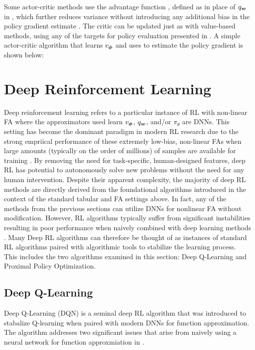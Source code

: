 Some actor-critic methods use the advantage function , defined as %
in place of $q_{\bm w}$ in , which further reduces variance without introducing any additional bias in the policy gradient estimate \cite{sutton1998introduction}.
The critic can be updated just as with value-based methods, using any of the targets for policy evaluation presented in . A simple actor-critic algorithm that learns $v_{\bm \phi}$ and uses  to estimate the policy gradient is shown below:

\section{Deep Reinforcement Learning}
Deep reinforcement learning refers to a particular instance of RL with non-linear FA where the approximators used learn $v_{\bm \phi}$, $q_{\bm w}$, and/or $\pi_\theta$ are DNNs. This setting has become the dominant paradigm in modern RL research due to the strong empriical performance of these extremely low-bias, non-linear FAs when large amounts (typically on the order of millions) of samples are available for training . By removing the need for task-specific, human-designed features, deep RL has potential to autonomously solve new problems without the need for any human intervention. Despite their apparent complexity, the majority of deep RL methods are directly derived from the foundational algorithms introduced in the context of the standard tabular and FA settings above. In fact, any of the methods from the previous sections can utilize DNNs for nonlinear FA without modification. However, RL algorithms typically suffer from significant instabilities resulting in poor performance when naively combined with deep learning methods . Many Deep RL algorithms can therefore be thought of as instances of standard RL algorithms paired with algorithmic tools to stabilize the learning process. This includes the two algorithms examined in this section: Deep Q-Learning and Proximal Policy Optimization.

\subsection{Deep Q-Learning} 
Deep Q-Learning (DQN)  is a seminal deep RL algorithm that was introduced to stabalize Q-learning when paired with modern DNNs for function approximation. The algorithm addresses two significant issues that arise from naively using a neural network for function approxmiation in . 

